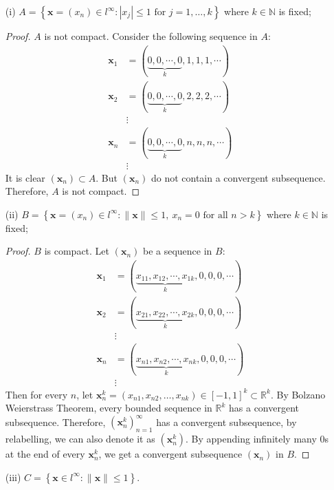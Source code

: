 \documentclass[11pt,a4paper]{amsart}
\def\R{{\mathbb R}}
\def\N{{\mathbb N}}
\begin{document}
\begin{itemize}
	\item[(i)] $\displaystyle{ A = \left\{ {\bm x}=(x_n)\in l^\infty: |x_j| \le 1 \mbox{ for $j=1,\dots,k$} \right\}}$
	where $k\in \N$ is fixed;

  \begin{proof}
  $A$ is not compact. Consider the following sequence in $A$:
  \begin{align*}
    \bm x_1 &= ( \underbrace{0, 0,\cdots, 0}_{k},1,1,1,\cdots ) \\
    \bm x_2 &= ( \underbrace{0, 0,\cdots, 0}_{k},2,2,2,\cdots ) \\
            &\vdots \\
    \bm x_n &= ( \underbrace{0, 0,\cdots, 0}_{k},n,n,n,\cdots )  \\
            &\vdots
  \end{align*}
  It is clear $(\bm x_n) \subset A$. But $(\bm x_n)$ do not contain a convergent subsequence.
  Therefore, $A$ is not compact.
  \end{proof}

	\item[(ii)] $\displaystyle{ B = \left\{ {\bm x}=(x_n)\in l^\infty:  \|{\bm x}\|\le 1, \ x_n=0 \mbox{ for all } n>k \right\}}$
	where $k\in \N$ is fixed;

  \begin{proof}
  $B$ is compact. Let $(\bm x_n)$ be a sequence in $B$:
  \begin{align*}
    \bm x_1 &= ( \underbrace{x_{11}, x_{12},\cdots, x_{1k}}_{k},0,0,0,\cdots ) \\
    \bm x_2 &= ( \underbrace{x_{21}, x_{22},\cdots, x_{2k}}_{k},0,0,0,\cdots ) \\
            &\vdots \\
    \bm x_n &= ( \underbrace{x_{n1}, x_{n2},\cdots, x_{nk}}_{k},0,0,0,\cdots )  \\
            &\vdots
  \end{align*}
  Then for every $n$, let $\bm x_n^k = (x_{n1}, x_{n2}, \dots, x_{nk}) \in [-1,1]^k \subset \R^k$.
  By Bolzano Weierstrass Theorem, every bounded sequence in $\R^k$ has a convergent subsequence.
  Therefore, $(\bm x_n^k)_{n=1}^{\infty}$ has a convergent subsequence, by relabelling,
  we can also denote it as $(\bm x_n^k)$. By appending infinitely many $0$s at the end of every $\bm x_n^k$,
  we get a convergent subsequence $(\bm x_n)$ in $B$.
  \end{proof}

	\item[(iii)] $\displaystyle{C = \left\{ {\bm x}\in l^\infty:  \|{\bm x}\|\le 1 \right\}}$.


\end{itemize}
\end{document}
